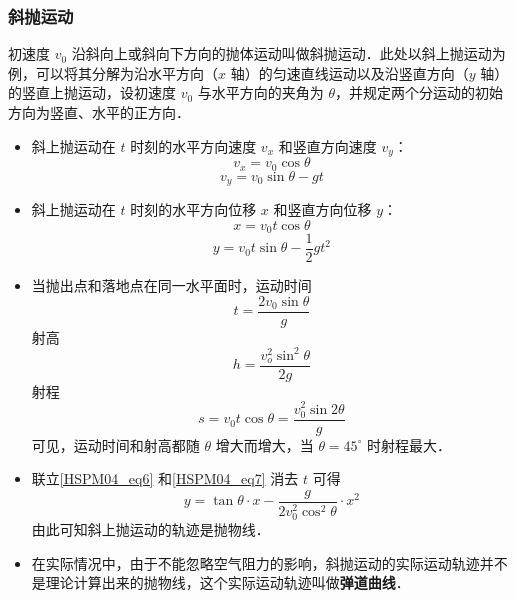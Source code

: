 \subsubsection{斜抛运动}

初速度 $v_0$ 沿斜向上或斜向下方向的抛体运动叫做斜抛运动．此处以斜上抛运动为例，可以将其分解为沿水平方向（$x$ 轴）的匀速直线运动以及沿竖直方向（$y$ 轴）的竖直上抛运动，设初速度 $v_0$ 与水平方向的夹角为 $\theta$，并规定两个分运动的初始方向为竖直、水平的正方向．

\begin{itemize}
\item 斜上抛运动在 $t$ 时刻的水平方向速度 $v_x$ 和竖直方向速度 $v_y$：
\begin{equation}
v_x=v_0\cos\theta
\end{equation}
\begin{equation}
v_y=v_0\sin\theta-gt
\end{equation}

\item 斜上抛运动在 $t$ 时刻的水平方向位移 $x$ 和竖直方向位移 $y$：
\begin{equation}\label{HSPM04_eq6}
x=v_0t\cos\theta
\end{equation}
\begin{equation}\label{HSPM04_eq7}
y= v_0t\sin\theta-\frac12 gt^2
\end{equation}

\item 当抛出点和落地点在同一水平面时，运动时间
\begin{equation}
t=\frac{2v_0\sin\theta}{g}
\end{equation}
射高
\begin{equation}
h=\frac{v_o^2\sin^2\theta}{2g}
\end{equation}
射程
\begin{equation}
s=v_0t\cos\theta=\frac{v_0^2\sin{2\theta}}{g}
\end{equation}
可见，运动时间和射高都随 $\theta$ 增大而增大，当 $\theta=45^\circ$ 时射程最大．

\item 联立\autoref{HSPM04_eq6} 和\autoref{HSPM04_eq7} 消去 $t$ 可得
\begin{equation}
y=\tan\theta\cdot x-\frac{g}{2v_0^2\cos^2\theta}\cdot x^2
\end{equation}
由此可知斜上抛运动的轨迹是抛物线．

\item 在实际情况中，由于不能忽略空气阻力的影响，斜抛运动的实际运动轨迹并不是理论计算出来的抛物线，这个实际运动轨迹叫做\textbf{弹道曲线}．
\end{itemize}
